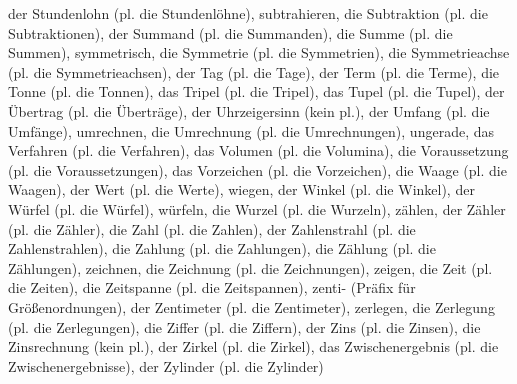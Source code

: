 der Stundenlohn (pl. die Stundenlöhne),
subtrahieren,
die Subtraktion (pl. die Subtraktionen),
der Summand (pl. die Summanden),
die Summe (pl. die Summen),
symmetrisch,
die Symmetrie (pl. die Symmetrien),
die Symmetrieachse (pl. die Symmetrieachsen),
der Tag (pl. die Tage),
der Term (pl. die Terme),
die Tonne (pl. die Tonnen),
das Tripel (pl. die Tripel),
das Tupel (pl. die Tupel),
der Übertrag (pl. die Überträge),
der Uhrzeigersinn (kein pl.),
der Umfang (pl. die Umfänge),
umrechnen,
die Umrechnung (pl. die Umrechnungen),
ungerade,
das Verfahren (pl. die Verfahren),
das Volumen (pl. die Volumina),
die Voraussetzung (pl. die Voraussetzungen),
das Vorzeichen (pl. die Vorzeichen),
die Waage (pl. die Waagen),
der Wert (pl. die Werte),
wiegen,
der Winkel (pl. die Winkel),
der Würfel (pl. die Würfel),
würfeln,
die Wurzel (pl. die Wurzeln),
zählen,
der Zähler (pl. die Zähler),
die Zahl (pl. die Zahlen),
der Zahlenstrahl (pl. die Zahlenstrahlen),
die Zahlung (pl. die Zahlungen),
die Zählung (pl. die Zählungen),
zeichnen,
die Zeichnung (pl. die Zeichnungen),
zeigen,
die Zeit (pl. die Zeiten),
die Zeitspanne (pl. die Zeitspannen),
zenti- (Präfix für Größenordnungen),
der Zentimeter (pl. die Zentimeter),
zerlegen,
die Zerlegung (pl. die Zerlegungen),
die Ziffer (pl. die Ziffern),
der Zins (pl. die Zinsen),
die Zinsrechnung (kein pl.),
der Zirkel (pl. die Zirkel),
das Zwischenergebnis (pl. die Zwischenergebnisse),
der Zylinder (pl. die Zylinder)